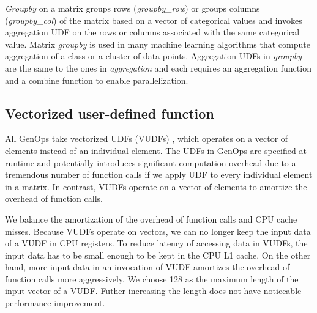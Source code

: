\textit{Groupby} on a matrix groups rows (\textit{groupby\_row}) or groups
columns (\textit{groupby\_col}) of the matrix based on
a vector of categorical values and invokes aggregation UDF on the rows or
columns associated with the same categorical value. Matrix \textit{groupby}
is used in many machine learning algorithms that compute aggregation of a class
or a cluster of data points. Aggregation UDFs in \textit{groupby} are the same
to the ones in \textit{aggregation} and each requires an aggregation function
and a combine function to enable parallelization.

\subsection{Vectorized user-defined function}
All GenOps take vectorized UDFs (VUDFs) ,
which operates on a vector of elements instead of an individual element.
The UDFs in GenOps are specified at runtime and potentially introduces significant
computation overhead due to a tremendous number of function calls if we apply
UDF to every individual element in a matrix. In contrast,
VUDFs operate on a vector of elements to amortize the overhead of function calls.

We balance the amortization of the overhead of function calls and CPU cache
misses. Because VUDFs operate on vectors, we can no longer keep the input data
of a VUDF in CPU registers. To reduce latency of accessing data in VUDFs,
the input data has to be small enough to be kept in the CPU L1 cache. On the
other hand, more input data in an invocation of VUDF amortizes the overhead of
function calls more aggressively. We choose 128 as the maximum length of
the input vector of a VUDF.
Futher increasing the length does not have noticeable performance improvement.

